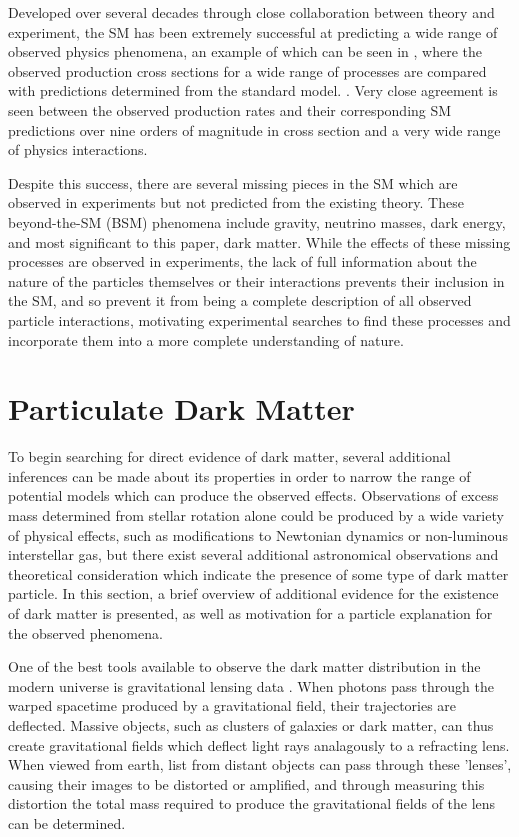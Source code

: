 Developed over several decades through close collaboration between theory and experiment, the SM has been extremely successful at predicting a wide range of observed physics phenomena, an example of which can be seen in , where the observed production cross sections for a wide range of processes are compared with predictions determined from the standard model.
.
Very close agreement is seen between the observed production rates and their corresponding SM predictions over nine orders of magnitude in cross section and a very wide range of physics interactions.

Despite this success, there are several missing pieces in the SM which are observed in experiments but not predicted from the existing theory.
These beyond-the-SM (BSM) phenomena include gravity, neutrino masses, dark energy, and most significant to this paper, dark matter.
While the effects of these missing processes are observed in experiments, the lack of full information about the nature of the particles themselves or their interactions prevents their inclusion in the SM, and so prevent it from being a complete description of all observed particle interactions, motivating experimental searches to find these processes and incorporate them into a more complete understanding of nature.

\section{Particulate Dark Matter}
To begin searching for direct evidence of dark matter, several additional inferences can be made about its properties in order to narrow the range of potential models which can produce the observed effects.
Observations of excess mass determined from stellar rotation alone could be produced by a wide variety of physical effects, such as modifications to Newtonian dynamics or non-luminous interstellar gas, but there exist several additional astronomical observations and theoretical consideration which indicate the presence of some type of dark matter particle.
In this section, a brief overview of additional evidence for the existence of dark matter is presented, as well as motivation for a particle explanation for the observed phenomena.

One of the best tools available to observe the dark matter distribution in the modern universe is gravitational lensing data \cite{Massey_2010}.
When photons pass through the warped spacetime produced by a gravitational field, their trajectories are deflected.
Massive objects, such as clusters of galaxies or dark matter, can thus create gravitational fields which deflect light rays analagously to a refracting lens.
When viewed from earth, list from distant objects can pass through these 'lenses', causing their images to be distorted or amplified, and through measuring this distortion the total mass required to produce the gravitational fields of the lens can be determined.

